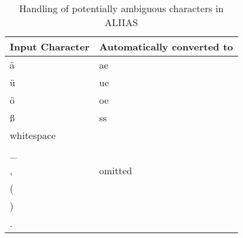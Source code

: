 \begin{table}[h]
 \caption{Handling of potentially ambiguous characters in ALIIAS}
  \centering
  \begin{tabular}{l l}
    \toprule
    Input Character      & Automatically converted to      \\
    \midrule
    \midrule
    ä            & ae                 \\
    \midrule
    ü           & ue                \\
    \midrule
    ö           & oe                \\
    \midrule
    ß           & ss                \\
    \midrule
    whitespace          &              \\
    \_          &              \\
    ,          & omitted             \\
    (          &              \\
    )          &              \\
    .          &              \\
    \bottomrule
  \end{tabular}
  \label{tab:typo}
\end{table}
